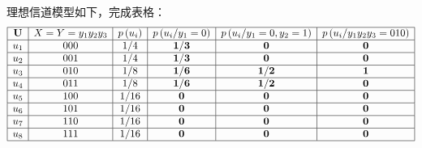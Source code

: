 \begin{remark}
    理想信道模型如下，完成表格：
    \[\begin{array}{|c|c|c|c|c|c|}
        \hline \mathbf{U} & X=Y=y_{1} y_{2} y_{3} & p\left(u_{i}\right) & p\left(u_{i} / y_{1}=0\right) & p\left(u_{i} / y_{1}=0, y_{2}=1\right) & p\left(u_{i} / y_{1} y_{2} y_{3}=010\right) \\
        \hline u_{1} & 000 & 1 / 4 & \mathbf{1 / 3} & \mathbf{0} & \mathbf{0} \\
        \hline u_{2} & 001 & 1 / 4 & \mathbf{1 / 3} & \mathbf{0} & \mathbf{0} \\
        \hline u_{3} & 010 & 1 / 8 & \mathbf{1 / 6} & \mathbf{1} / \mathbf{2} & \mathbf{1} \\
        \hline u_{4} & 011 & 1 / 8 & \mathbf{1 / 6} & \mathbf{1 / 2} & \mathbf{0} \\
        \hline u_{5} & 100 & 1 / 16 & \mathbf{0} & \mathbf{0} & \mathbf{0} \\
        \hline u_{6} & 101 & 1 / 16 & \mathbf{0} & \mathbf{0} & \mathbf{0} \\
        \hline u_{7} & 110 & 1 / 16 & \mathbf{0} & \mathbf{0} & \mathbf{0} \\
        \hline u_{8} & 111 & 1 / 16 & \mathbf{0} & \mathbf{0} & \mathbf{0} \\
        \hline
    \end{array}\]
\end{remark}


